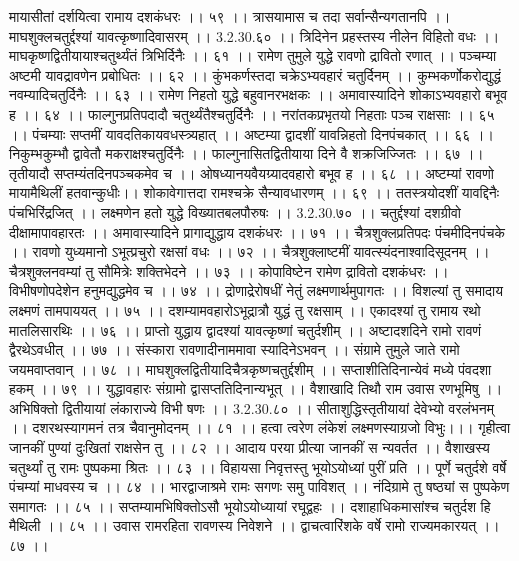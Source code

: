 मायासीतां दर्शयित्वा रामाय दशकंधरः ।। ५९ ।।
त्रासयामास च तदा सर्वान्सैन्यगतानपि ।।
माघशुक्लचतुर्द्दश्यां यावत्कृष्णादिवासरम् ।। 3.2.30.६० ।।
त्रिदिनेन प्रहस्तस्य नीलेन विहितो वधः ।।
माघकृष्णद्वितीयायाश्चतुर्थ्यंतं त्रिभिर्दिनैः ।। ६१ ।।
रामेण तुमुले युद्धे रावणो द्रावितो रणात् ।।
पञ्चम्या अष्टमी यावद्रावणेन प्रबोधितः ।। ६२ ।।
कुंभकर्णस्तदा चक्रेऽभ्यवहारं चतुर्दिनम् ।।
कुम्भकर्णोकरोद्युद्धं नवम्यादिचतुर्दिनैः ।। ६३ ।।
रामेण निहतो युद्धे बहुवानरभक्षकः ।।
अमावास्यादिने शोकाऽभ्यवहारो बभूव ह ।। ६४ ।।
फाल्गुनप्रतिपदादौ चतुर्थ्यंतैश्चतुर्दिनैः ।।
नरांतकप्रभृतयो निहताः पञ्च राक्षसाः ।। ६५ ।।
पंचम्याः सप्तमीं यावदतिकायवधस्त्र्यहात् ।।
अष्टम्या द्वादशीं यावन्निहतो दिनपंचकात् ।। ६६ ।।
निकुम्भकुम्भौ द्वावेतौ मकराक्षश्चतुर्दिनैः ।।
फाल्गुनासितद्वितीयाया दिने वै शक्रजिज्जितः ।। ६७ ।।
तृतीयादौ सप्तम्यंतदिनपञ्चकमेव च ।।
ओषध्यानयवैयग्र्यादवहारो बभूव ह ।। ६८ ।।
अष्टम्यां रावणो मायामैथिलीं हतवान्कुधीः।।
शोकावेगात्तदा रामश्चक्रे सैन्यावधारणम् ।। ६९ ।।
ततस्त्रयोदशीं यावद्दिनैः पंचभिरिंद्रजित् ।।
लक्ष्मणेन हतो युद्धे विख्यातबलपौरुषः ।। 3.2.30.७० ।।
चतुर्द्दश्यां दशग्रीवो दीक्षामापावहारतः ।।
अमावास्यादिने प्रागाद्युद्धाय दशकंधरः ।। ७१ ।।
चैत्रशुक्लप्रतिपदः पंचमीदिनपंचके ।।
रावणो युध्यमानो ऽभूत्प्रचुरो रक्षसां वधः ।। ७२ ।।
चैत्रशुक्लाष्टमीं यावत्स्यंदनाश्वादिसूदनम् ।।
चैत्रशुक्लनवम्यां तु सौमित्रेः शक्तिभेदने ।। ७३ ।।
कोपाविष्टेन रामेण द्रावितो दशकंधरः ।।
विभीषणोपदेशेन हनुमद्युद्धमेव च ।। ७४ ।।
द्रोणाद्रेरोषधीं नेतुं लक्ष्मणार्थमुपागतः ।।
विशल्यां तु समादाय लक्ष्मणं तामपाययत् ।। ७५ ।।
दशम्यामवहारोऽभूद्रात्रौ युद्धं तु रक्षसाम् ।।
एकादश्यां तु रामाय रथो मातलिसारथिः ।। ७६ ।।
प्राप्तो युद्धाय द्वादश्यां यावत्कृष्णां चतुर्दशीम् ।।
अष्टादशदिने रामो रावणं द्वैरथेऽवधीत् ।। ७७ ।।
संस्कारा रावणादीनाममावा स्यादिनेऽभवन् ।।
संग्रामे तुमुले जाते रामो जयमवाप्तवान् ।। ७८ ।।
माघशुक्लद्वितीयादिचैत्रकृष्णचतुर्द्दशीम् ।।
सप्ताशीतिदिनान्येवं मध्ये पंवदशा हकम् ।। ७९ ।।
युद्धावहारः संग्रामो द्वासप्ततिदिनान्यभूत् ।।
वैशाखादि तिथौ राम उवास रणभूमिषु ।।
अभिषिक्तो द्वितीयायां लंकाराज्ये विभी षणः ।। 3.2.30.८० ।।
सीताशुद्धिस्तृतीयायां देवेभ्यो वरलंभनम् ।।
दशरथस्यागमनं तत्र चैवानुमोदनम् ।। ८१ ।।
हत्वा त्वरेण लंकेशं लक्ष्मणस्याग्रजो विभुः।।।
गृहीत्वा जानकीं पुण्यां दुःखितां राक्षसेन तु ।। ८२ ।।
आदाय परया प्रीत्या जानकीं स न्यवर्तत ।।
वैशाखस्य चतुर्थ्यां तु रामः पुष्पकमा श्रितः ।। ८३ ।।
विहायसा निवृत्तस्तु भूयोऽयोध्यां पुरीं प्रति ।।
पूर्णे चतुर्दशे वर्षे पंचम्यां माधवस्य च ।। ८४ ।।
भारद्वाजाश्रमे रामः सगणः समु पाविशत् ।।
नंदिग्रामे तु षष्ठ्यां स पुष्पकेण समागतः ।। ८५ ।।
सप्तम्यामभिषिक्तोऽसौ भूयोऽयोध्यायां रघूद्वहः ।।
दशाहाधिकमासांश्च चतुर्दश हि मैथिली ।। ८५ ।।
उवास रामरहिता रावणस्य निवेशने ।।
द्वाचत्वारिंशके वर्षे रामो राज्यमकारयत् ।। ८७ ।।

